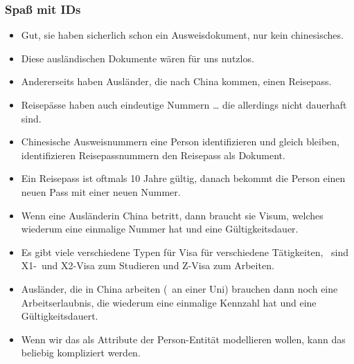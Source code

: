 \documentclass[aspectratio=169,mathserif,notheorems]{beamer}%
\begin{document}
\begin{frame}[t]%
\frametitle{Spaß mit IDs}%
\begin{itemize}%
%
%
%
%
%
%
\item<4-> Gut, sie haben sicherlich schon ein Ausweisdokument, nur kein chinesisches.%
%
\item<5-> Diese ausländischen Dokumente wären für uns nutzlos.%
%
\item<6-> Andererseits haben Ausländer, die nach China kommen, einen Reisepass\cite{ICAO2021MRTDP3SCTAMEE}.%
%
\item<7-> Reisepässe haben auch eindeutige Nummern {\dots} die allerdings nicht dauerhaft sind.%
%
\item<8-> Chinesische Ausweisnummern eine Person identifizieren und gleich bleiben, identifizieren Reisepassnummern den Reisepass als Dokument.%
%
\item<9-> Ein Reisepass ist oftmals 10 Jahre gültig, danach bekommt die Person einen neuen Pass mit einer neuen Nummer.%
%
\item<10-> Wenn eine Ausländerin China betritt, dann braucht sie Visum, welches wiederum eine einmalige Nummer hat und eine Gültigkeitsdauer\cite{CMOFA2019ITCV}.%
%
\item<11-> Es gibt viele verschiedene Typen für Visa für verschiedene Tätigkeiten, \DEzB\ sind X1-\ und X2-Visa zum Studieren und Z-Visa zum Arbeiten.%
%
\item<12-> Ausländer, die in China arbeiten (\DEzB\ an einer Uni) brauchen dann noch eine Arbeitserlaubnis\cite{BD2006BDBK:WOFFITOROC}, die wiederum eine einmalige Kennzahl hat und eine Gültigkeitsdauert.%
%
\item<13-> Wenn wir das als Attribute der Person-Entität modellieren wollen, kann das beliebig kompliziert werden.%
\end{itemize}%
\end{frame}%
%
\end{document}
